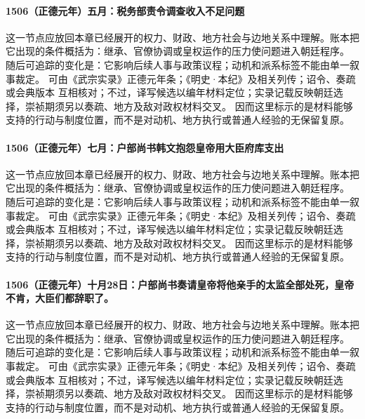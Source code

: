 \paragraph{1506（正德元年）五月：税务部责令调查收入不足问题} 这一节点应放回本章已经展开的权力、财政、地方社会与边地关系中理解。账本把它出现的条件概括为：继承、官僚协调或皇权运作的压力使问题进入朝廷程序。 随后可追踪的变化是：它影响后续人事与政策议程；动机和派系标签不能由单一叙事裁定。 可由《武宗实录》正德元年条；《明史·本纪》及相关列传；诏令、奏疏或会典版本 互相核对；不过，译写候选以编年材料定位；实录记载反映朝廷选择，崇祯期须另以奏疏、地方及敌对政权材料交叉。 因而这里标示的是材料能够支持的行动与制度位置，而不是对动机、地方执行或普通人经验的无保留复原。

\paragraph{1506（正德元年）七月：户部尚书韩文抱怨皇帝用大臣府库支出} 这一节点应放回本章已经展开的权力、财政、地方社会与边地关系中理解。账本把它出现的条件概括为：继承、官僚协调或皇权运作的压力使问题进入朝廷程序。 随后可追踪的变化是：它影响后续人事与政策议程；动机和派系标签不能由单一叙事裁定。 可由《武宗实录》正德元年条；《明史·本纪》及相关列传；诏令、奏疏或会典版本 互相核对；不过，译写候选以编年材料定位；实录记载反映朝廷选择，崇祯期须另以奏疏、地方及敌对政权材料交叉。 因而这里标示的是材料能够支持的行动与制度位置，而不是对动机、地方执行或普通人经验的无保留复原。

\paragraph{1506（正德元年）十月28日：户部尚书奏请皇帝将他亲手的太监全部处死，皇帝不肯，大臣们都辞职了。} 这一节点应放回本章已经展开的权力、财政、地方社会与边地关系中理解。账本把它出现的条件概括为：继承、官僚协调或皇权运作的压力使问题进入朝廷程序。 随后可追踪的变化是：它影响后续人事与政策议程；动机和派系标签不能由单一叙事裁定。 可由《武宗实录》正德元年条；《明史·本纪》及相关列传；诏令、奏疏或会典版本 互相核对；不过，译写候选以编年材料定位；实录记载反映朝廷选择，崇祯期须另以奏疏、地方及敌对政权材料交叉。 因而这里标示的是材料能够支持的行动与制度位置，而不是对动机、地方执行或普通人经验的无保留复原。
